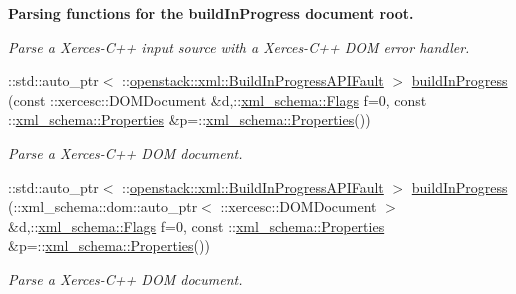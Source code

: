 \begin{Indent}{\bf Parsing functions for the buildInProgress document root.}
\begin{DoxyCompactItemize}
\begin{DoxyCompactList}\small\item\em Parse a Xerces-\/C++ input source with a Xerces-\/C++ DOM error handler. \item\end{DoxyCompactList}\item 
::std::auto\_\-ptr$<$ ::\hyperlink{classopenstack_1_1xml_1_1BuildInProgressAPIFault}{openstack::xml::BuildInProgressAPIFault} $>$ \hyperlink{namespaceopenstack_1_1xml_a6acb5d8fd7d9f93713a6b4d85b0a19f4}{buildInProgress} (const ::xercesc::DOMDocument \&d,::\hyperlink{namespacexml__schema_affb4c227cbd9aa7453dd1dc5a1401943}{xml\_\-schema::Flags} f=0, const ::\hyperlink{namespacexml__schema_ad27ce19a7ee1d3b1064092648898f64c}{xml\_\-schema::Properties} \&p=::\hyperlink{namespacexml__schema_ad27ce19a7ee1d3b1064092648898f64c}{xml\_\-schema::Properties}())
\begin{DoxyCompactList}\small\item\em Parse a Xerces-\/C++ DOM document. \item\end{DoxyCompactList}\item 
::std::auto\_\-ptr$<$ ::\hyperlink{classopenstack_1_1xml_1_1BuildInProgressAPIFault}{openstack::xml::BuildInProgressAPIFault} $>$ \hyperlink{namespaceopenstack_1_1xml_aca863934107b540ed6dd53a2d44ddb2b}{buildInProgress} (::xml\_\-schema::dom::auto\_\-ptr$<$ ::xercesc::DOMDocument $>$ \&d,::\hyperlink{namespacexml__schema_affb4c227cbd9aa7453dd1dc5a1401943}{xml\_\-schema::Flags} f=0, const ::\hyperlink{namespacexml__schema_ad27ce19a7ee1d3b1064092648898f64c}{xml\_\-schema::Properties} \&p=::\hyperlink{namespacexml__schema_ad27ce19a7ee1d3b1064092648898f64c}{xml\_\-schema::Properties}())
\begin{DoxyCompactList}\small\item\em Parse a Xerces-\/C++ DOM document. \item\end{DoxyCompactList}\end{DoxyCompactItemize}
\end{Indent}

